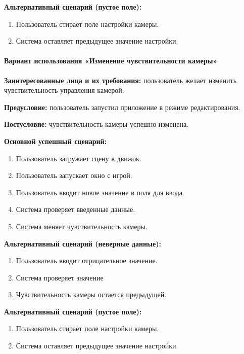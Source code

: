 \textbf{Альтернативный сценарий (пустое поле):}
\begin{enumerate}
	\item Пользователь стирает поле настройки камеры.
	
	\item Система оставляет предыдущее значение настройки.
\end{enumerate}

\paragraph{Вариант использования «Изменение чувствительности камеры»}
\textbf{Заинтересованные лица и их требования:} пользователь желает изменить чувствительность управления камерой.

\textbf{Предусловие:} пользователь запустил приложение в режиме редактирования.

\textbf{Постусловие:} чувствительность камеры успешно изменена.

\textbf{Основной успешный сценарий:}

\begin{enumerate}
	\item Пользователь загружает сцену в движок.
	
	\item Пользователь запускает окно с игрой.
	
	\item Пользователь вводит новое значение в поля для ввода.
	
	\item Система проверяет введенные данные.
	
	\item Система меняет чувствительность камеры.
\end{enumerate}

\textbf{Альтернативный сценарий (неверные данные):}
\begin{enumerate}
	\item Пользователь вводит отрицательное значение.
	
	\item Система проверяет значение
	
	\item Чувствительность камеры остается предыдущей.
\end{enumerate}

\textbf{Альтернативный сценарий (пустое поле):}
\begin{enumerate}
	\item Пользователь стирает поле настройки камеры.
	
	\item Система оставляет предыдущее значение настройки.
\end{enumerate}

